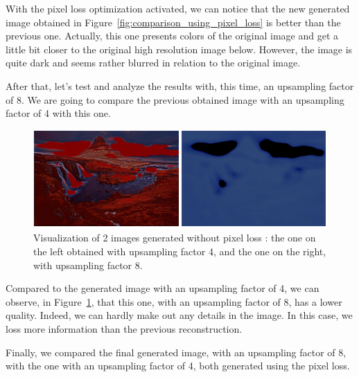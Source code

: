 \documentclass{article}
\begin{document}
{{        With the pixel loss optimization activated, we can notice that the new generated image obtained in Figure~\ref{fig:comparison_using_pixel_loss} is better than the previous one. Actually, this one presents colors of the original image and get a little bit closer to the original high resolution image below. However, the image is quite dark and seems rather blurred in relation to the original image.

        \bigskip

        After that, let's test and analyze the results with, this time, an upsampling factor of 8. We are going to compare the previous obtained image with an upsampling factor of 4 with this one.

        \begin{figure}[ht]
            \centering
            \includegraphics[height=0.2\textheight]{images/comparison_scaling_factor_without_pixel_loss.png}
            \caption{Visualization of 2 images generated without pixel loss : the one on the left obtained with upsampling factor 4, and the one on the right, with upsampling factor 8.}
            \label{fig:comparison_scaling_factor_without_pixel_loss}
        \end{figure}

        Compared to the generated image with an upsampling factor of 4, we can observe, in Figure~\ref{fig:comparison_scaling_factor_without_pixel_loss}, that this one, with an upsampling factor of 8, has a lower quality. Indeed, we can hardly make out any details in the image. In this case, we loss more information than the previous reconstruction.

        \bigskip

        Finally, we compared the final generated image, with an upsampling factor of 8, with the one with an upsampling factor of 4, both generated using the pixel loss.

}}
\end{document}
